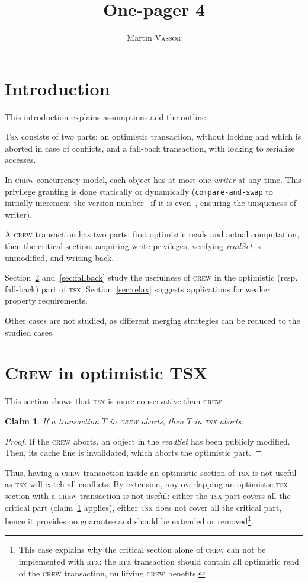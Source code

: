 \documentclass[twocolumn]{article}
\title{One-pager 4}
\author{Martin \textsc{Vassor}}
\date{}
\newtheorem{claim}{Claim}
\begin{document}
\maketitle
\section{Introduction}
This introduction explains assumptions and the outline.

\textsc{Tsx} consists of two parts: an optimistic transaction, without locking and which is aborted in case of conflicts, and a fall-back transaction, with locking to serialize accesses. 

In \textsc{crew} concurrency model, each object has at most one \emph{writer} at any time. This privilege granting is done statically or dynamically (\texttt{compare-and-swap} to initially increment the version number --if it is even--, ensuring the uniqueness of writer). 

A \textsc{crew} transaction has two parts: first optimistic reads and actual computation, then the critical section: acquiring write privileges, verifying \emph{readSet} is unmodified, and writing back.

Section~\ref{sec:opt} and~\ref{sec:fallback} study the usefulness of \textsc{crew} in the optimistic (resp. fall-back) part of \textsc{tsx}. Section~\ref{sec:relax} suggests applications for weaker property requirements.

Other cases are not studied, as different merging strategies can be reduced to the studied cases.

\section{\textsc{Crew} in optimistic \textsc{TSX}}
\label{sec:opt}
This section shows that \textsc{tsx} is more conservative than \textsc{crew}.
\begin{claim}
	\label{claim_1}
	If a transaction $T$ in \textsc{crew} aborts, then $T$ in \textsc{tsx} aborts.
\end{claim}

\begin{proof}
	If the \textsc{crew} aborts, an object in the \emph{readSet} has been publicly modified. Then, its cache line is invalidated, which aborts the optimistic part.
\end{proof}

Thus, having a \textsc{crew} transaction inside an optimistic section of \textsc{tsx} is not useful as \textsc{tsx} will catch all conflicts. By extension, any overlapping an optimistic \textsc{tsx} section with a \textsc{crew} transaction is not useful: either the \textsc{tsx} part covers all the critical part (claim~\ref{claim_1} applies), either \textsc{tsx} does not cover all the critical part, hence it provides no guarantee and should be extended or removed\footnote{This case explains why the critical section alone of \textsc{crew} can not be implemented with \textsc{rtx}: the \textsc{rtx} transaction should contain all optimistic read of the \textsc{crew} transaction, nullifying \textsc{crew} benefits.}.
\end{document}
